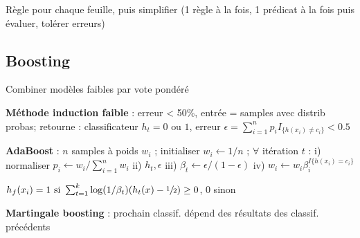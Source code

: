 Règle pour chaque feuille, puis simplifier (1 règle à la fois, 1 prédicat à la fois puis évaluer, tolérer erreurs)



\subsection*{Boosting}

Combiner modèles faibles par vote pondéré

\textbf{Méthode induction faible} : erreur < 50\%, entrée = samples avec distrib probas; retourne : classificateur $h_t = 0 \text{ ou } 1$, erreur $\epsilon = \sum_{i=1}^n p_i I_{\{h(x_i)\neq c_i\}} < 0.5$

\textbf{AdaBoost} : $n$ samples à poids $w_i$ ; initialiser $w_i \leftarrow 1/n$ ;  $\forall$ itération $t$ : i) normaliser $p_i \leftarrow w_i/\sum_{i=1}^nw_i$ ii) $h_t, \epsilon$ iii) $\beta_t \leftarrow \epsilon/(1-\epsilon)$ iv) $w_i\leftarrow w_i \beta_i^{I{\{h(x_i)=c_i\}}}$

$h_f(x_i) = 1 \text{ si } \sum_{t=1}^k \log(1/\beta_t)(h_t(x) - \sfrac{1}{2}) \geq 0$, 0 sinon

\textbf{Martingale boosting} : prochain classif. dépend des résultats des classif. précédents

